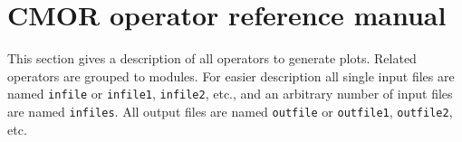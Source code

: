 \chapter{\label{refman}CMOR operator reference manual}

This section gives a description of all {\CDO} operators to generate plots.
Related operators are grouped to modules.
For easier description all single input files are named \texttt{infile} or \texttt{infile1}, \texttt{infile2}, etc.,
and an arbitrary number of input files are named \texttt{infiles}.
All output files are named \texttt{outfile} or \texttt{outfile1}, \texttt{outfile2}, etc.


\hspace{3mm}



